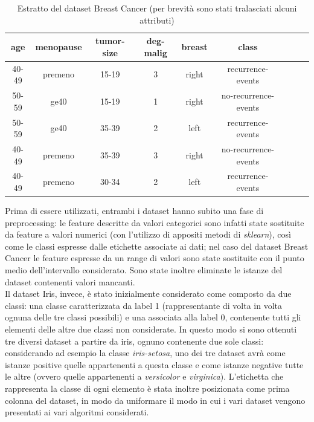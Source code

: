 \documentclass[oneside, openany]{book}
\begin{document}
	\begin{table}[h]
		\caption{Estratto del dataset Breast Cancer (per brevità sono stati tralasciati alcuni attributi)}
		\begin{center}
			\begin{tabular}{|c|c|c|c|c|c|c|c|c|}
				\hline
					age &  menopause &  tumor-size &  deg-malig &  breast &  class\\
				\hline
					40-49 &   premeno &      15-19 &          3 &  right &     recurrence-events\\ 
					50-59 &      ge40 &      15-19 &          1 &  right &     no-recurrence-events\\ 
					50-59 &      ge40 &      35-39 &          2 &   left &     recurrence-events\\ 
					40-49 &   premeno &      35-39 &          3 &  right &     no-recurrence-events\\
					40-49 &   premeno &      30-34 &          2 &   left &     recurrence-events\\
				\hline	
			\end{tabular}
		\end{center}
		\label{tab:breast}
	\end{table}
	
	Prima di essere utilizzati, entrambi i dataset hanno subito una fase di preprocessing: le feature descritte da valori categorici sono infatti state sostituite da feature a valori numerici (con l'utilizzo di appositi metodi di \textit{sklearn}), così come le classi espresse dalle etichette associate ai dati; nel caso del dataset Breast Cancer le feature espresse da un range di valori sono state sostituite con il punto medio dell'intervallo considerato. Sono state inoltre eliminate le istanze del dataset contenenti valori mancanti.\\
	Il dataset Iris, invece, è stato inizialmente considerato come composto da due classi: una classe caratterizzata da label 1 (rappresentante di volta in volta ognuna delle tre classi possibili) e una associata alla label 0, contenente tutti gli elementi delle altre due classi non considerate. In questo modo si sono ottenuti tre diversi dataset a partire da iris, ognuno contenente due sole classi: considerando ad esempio la classe \textit{iris-setosa}, uno dei tre dataset avrà come istanze positive quelle appartenenti a questa classe e come istanze negative tutte le altre (ovvero quelle appartenenti a \textit{versicolor} e \textit{virginica}).  L'etichetta che rappresenta la classe di ogni elemento è stata inoltre posizionata come prima colonna del dataset, in modo da uniformare il modo in cui i vari dataset vengono presentati ai vari algoritmi considerati.
	 
\end{document}
